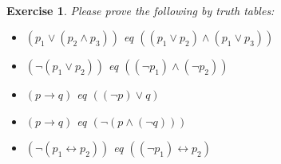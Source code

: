 \documentclass[12pt,a4paper]{article}
\theoremstyle{plain}
\newtheorem{exercise}{Exercise}
\begin{document}
\ \\
\begin{exercise}
Please prove the following by truth tables:
%
\begin{itemize}

\item[(a)] $( p_1 \vee ( p_2 \wedge p_3 ) )$ eq $( ( p_1 \vee p_2 ) \wedge ( p_1 \vee p_3 ) )$

\item[(b)] $( \neg ( p_1 \vee p_2 ) )$ eq $( ( \neg p_1 ) \wedge ( \neg p_2 ) )$

\item[(c)] $( p \rightarrow q )$ eq $( ( \neg p ) \vee q )$

\item[(d)] $( p \rightarrow q )$ eq $( \neg ( p \wedge ( \neg q ) ) )$

\item[(e)] $( \neg ( p_1 \leftrightarrow p_2 ) )$ eq $( ( \neg p_1 ) \leftrightarrow p_2 )$

\end{itemize} 
\end{exercise}
\end{document}
